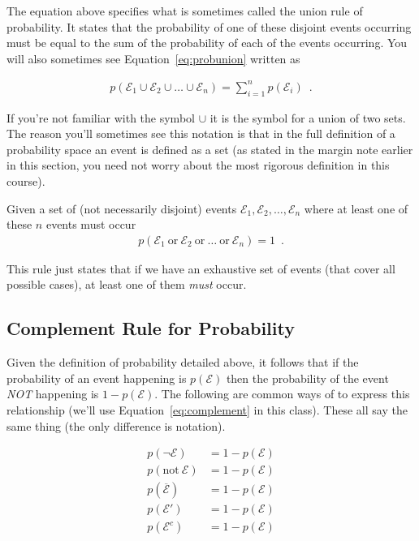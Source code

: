 \documentclass[assignment01_Solutions]{subfiles}
\begin{document}
The equation above specifies what is sometimes called the union rule of probability.  It states that the probability of one of these disjoint events occurring must be equal to the sum of the probability of each of the events occurring.  You will also sometimes see Equation~\ref{eq:probunion} written as

\begin{align}
p(\mathcal{E}_1 \cup \mathcal{E}_2 \cup \ldots \cup \mathcal{E}_n) = \sum_{i=1}^n p(\mathcal{E}_i) \enspace .
\end{align}

If you're not familiar with the symbol $\cup$ it is the symbol for a union of two sets.  The reason you'll sometimes see this notation is that in the full definition of a probability space an event is defined as a set (as stated in the margin note earlier in this section, you need not worry about the most rigorous definition in this course).

\item Given a set of (not necessarily disjoint) events $\mathcal{E}_1, \mathcal{E}_2, \ldots, \mathcal{E}_n$ where at least one of these $n$ events must occur
\begin{align}
p(\mathcal{E}_1~\mbox{or}~\mathcal{E}_2~\mbox{or}~\ldots~\mbox{or}~\mathcal{E}_n) = 1 \enspace .
\end{align}
\ei

This rule just states that if we have an exhaustive set of events (that cover all possible cases), at least one of them \emph{must} occur.

\subsection{Complement Rule for Probability}

Given the definition of probability detailed above, it follows that if the probability of an event happening is $p(\mathcal{E})$ then the probability of the event \emph{NOT} happening is $1-p(\mathcal{E})$.   The following are common ways of to express this relationship (we'll use Equation~\ref{eq:complement} in this class).  These all say the same thing (the only difference is notation).

\begin{align}
p(\neg \mathcal{E}) &= 1 - p(\mathcal{E}) \label{eq:complement} \\
p(\mbox{not}~\mathcal{E}) &= 1 - p(\mathcal{E}) \nonumber \\
p(\overline{\mathcal{E}}) &= 1 - p(\mathcal{E}) \nonumber \\
p(\mathcal{E}') &= 1 - p(\mathcal{E}) \nonumber \\
p(\mathcal{E}^c) &= 1 - p(\mathcal{E}) \nonumber
\end{align}
\end{document}
